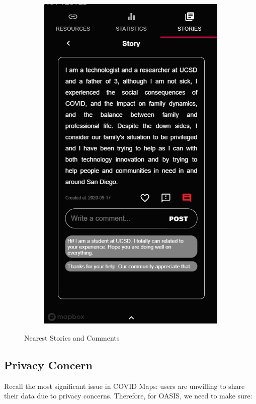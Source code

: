 \documentclass{ucsdreport}
\begin{document}
\begin{figure}[H]
\begin{subfigure}{.49\textwidth}
		\includegraphics[scale = 0.7]{images/comments.PNG}
	\end{subfigure}
	\caption{Nearest Stories and Comments}
\end{figure}


\subsection{Privacy Concern}
Recall the most significant issue in COVID Maps: users are unwilling to share 
their data due to privacy concerns. Therefore, for OASIS, we need to make sure:
\end{document}
